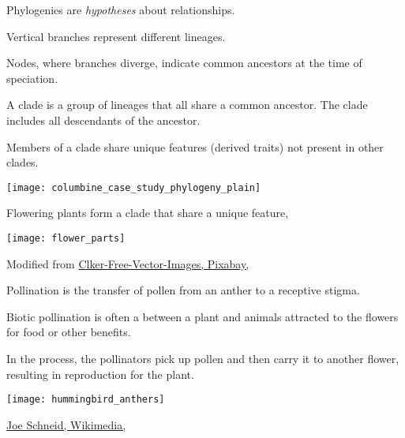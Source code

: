 \documentclass[t,handout]{beamer}  %
\begin{document}
%
\begin{frame}[t]{Phylogenies are \emph{hypotheses} about relationships.}
	
	\begin{multicols}{2}
		\hangpara Vertical branches represent different lineages.\vspace*{-1ex}

		\hangpara Nodes, where branches diverge, indicate common ancestors at the time of speciation.\vspace*{-1ex}

		\hangpara A clade is a group of lineages that all share a common ancestor. The clade includes all descendants of the ancestor.\vspace*{-1ex}
			
		\hangpara Members of a clade share unique features (derived traits) not present in other clades.\vspace*{-1ex} %

	\columnbreak
		
		\hfill \texttt{[image: columbine\_case\_study\_phylogeny\_plain]}
		
	\end{multicols}
\end{frame}
%
\begin{frame}[t]{Flowering plants form a clade that share a unique feature, }
	
	{\centering 
	\texttt{[image: flower\_parts]}
	}
	
	\vfilll
	
	\hfill \tiny Modified from \href{https://pixabay.com/en/diagram-flower-mature-anatomy-41571/}{Clker-Free-Vector-Images, Pixabay, \cc{}}
	
\end{frame}
%
\begin{frame}[t]{Pollination is the transfer of pollen from an anther to a receptive stigma.}

	\begin{multicols}{2}
	\hangpara Biotic pollination is often a  between a plant and animals attracted to the flowers for food or other benefits. 
	
	\hangpara In the process, the pollinators pick up pollen and then carry it to another flower, resulting in reproduction for the plant. 

	\columnbreak
	
	\texttt{[image: hummingbird\_anthers]}
	\end{multicols}
	
	\vfilll
	
	\hfill \tiny \href{https://commons.wikimedia.org/wiki/File:RubyThroatedHummingbird.jpg}{Joe Schneid, Wikimedia, } %
	
\end{frame}
\end{document}
